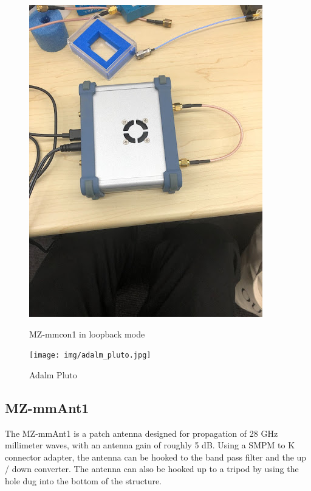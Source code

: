 \documentclass[a4paper,12pt]{report}
\begin{document}
\begin{figure}
  \centering
  \begin{minipage}{0.45\textwidth}
    \centering
    \includegraphics[clip, keepaspectratio, width=0.9\linewidth]{img/mz_mmcon1_loopback.jpg}
    \caption{MZ-mmcon1 in loopback mode}
    \label{fig:mz_mmcon1_loopback}
  \end{minipage}\hfill
  \begin{minipage}{0.45\textwidth}
    \centering
    \texttt{[image: img/adalm\_pluto.jpg]}
    \caption{Adalm Pluto}
    \label{img:adalm_pluto}
  \end{minipage}\hfill
\end{figure}


\subsection{MZ-mmAnt1}

The MZ-mmAnt1 is a patch antenna designed for
propagation of 28 GHz millimeter waves,
with an antenna gain of roughly 5 dB.
Using a SMPM to K connector adapter,
the antenna can be hooked to the band pass filter
and the up / down converter.
The antenna can also be hooked up to a tripod
by using the hole dug into the bottom of the structure.
\end{document}
